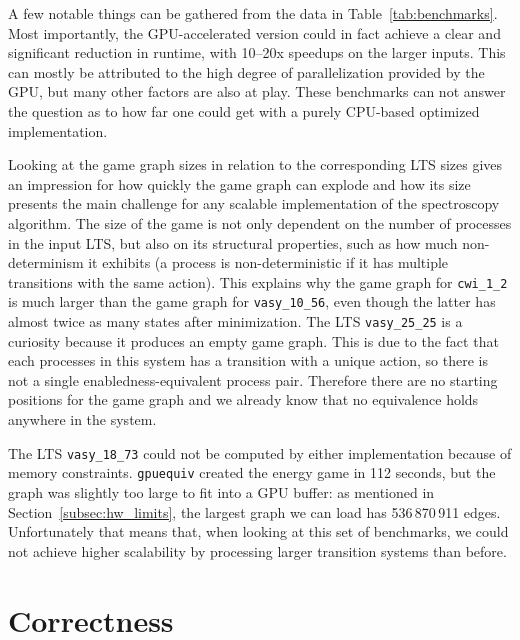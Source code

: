A few notable things can be gathered from the data in
Table~\ref{tab:benchmarks}.
Most importantly, the GPU-accelerated version could in fact achieve
a clear and significant reduction in runtime,
with 10--20x speedups on the larger inputs.
This can mostly be attributed to the high degree of parallelization provided by
the GPU,
but many other factors are also at play.
These benchmarks can not answer the question as to how far one could get with
a purely CPU-based optimized implementation.

Looking at the game graph sizes in relation to the corresponding LTS sizes
gives an impression for how quickly the game graph can explode
and how its size presents the main challenge for any scalable implementation of
the spectroscopy algorithm.
The size of the game is not only dependent on the number of processes in the
input LTS,
but also on its structural properties,
such as how much non-determinism it exhibits
(a process is non-deterministic if it has multiple transitions with the same
action).
This explains why the game graph for \texttt{cwi\_1\_2} is much larger
than the game graph for \texttt{vasy\_10\_56},
even though the latter has almost twice as many states after minimization.
The LTS \texttt{vasy\_25\_25} is a curiosity
because it produces an empty game graph.
This is due to the fact that each processes in this system has a transition
with a unique action,
so there is not a single enabledness-equivalent process pair.
Therefore there are no starting positions for the game graph and we already
know that no equivalence holds anywhere in the system.

The LTS \texttt{vasy\_18\_73} could not be computed by either implementation
because of memory constraints.
\texttt{gpuequiv} created the energy game in 112 seconds,
but the graph was slightly too large to fit into a GPU buffer:
as mentioned in Section~\ref{subsec:hw_limits},
the largest graph we can load has 536\,870\,911 edges.
Unfortunately that means that,
when looking at this set of benchmarks,
we could not achieve higher scalability by processing larger transition systems
than before.

\section{Correctness}
